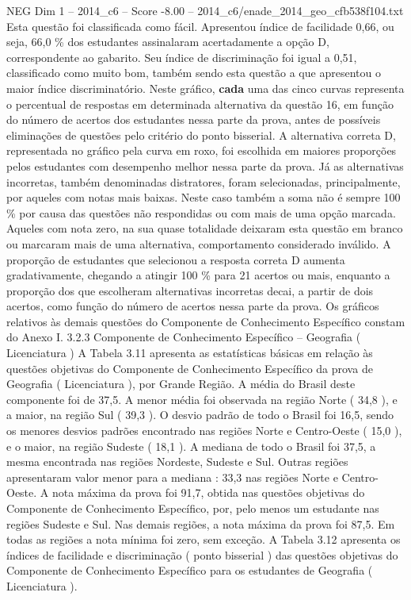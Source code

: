 \begin{textsample}{NEG Dim 1 – 2014\_c6 – Score -8.00 – 2014\_c6/enade\_2014\_geo\_cfb538f104.txt}
Esta questão foi classificada como fácil.
Apresentou índice de facilidade 0,66, ou seja, 66,0 \% dos estudantes assinalaram acertadamente a opção D, correspondente ao gabarito.
Seu índice de discriminação foi igual a 0,51, classificado como muito bom, também sendo esta questão a que apresentou o maior índice discriminatório.
Neste gráfico, \textbf{cada} uma das cinco curvas representa o percentual de respostas em determinada alternativa da questão 16, em função do número de acertos dos estudantes nessa parte da prova, antes de possíveis eliminações de questões pelo critério do ponto bisserial.
A alternativa correta D, representada no gráfico pela curva em roxo, foi escolhida em maiores proporções pelos estudantes com desempenho melhor nessa parte da prova.
Já as alternativas incorretas, também denominadas distratores, foram selecionadas, principalmente, por aqueles com notas mais baixas.
Neste caso também a soma não é sempre 100 \% por causa das questões não respondidas ou com mais de uma opção marcada.
Aqueles com nota zero, na sua quase totalidade deixaram esta questão em branco ou marcaram mais de uma alternativa, comportamento considerado inválido.
A proporção de estudantes que selecionou a resposta correta D aumenta gradativamente, chegando a atingir 100 \% para 21 acertos ou mais, enquanto a proporção dos que escolheram alternativas incorretas decai, a partir de dois acertos, como função do número de acertos nessa parte da prova.
Os gráficos relativos às demais questões do Componente de Conhecimento Específico constam do Anexo I. 3.2.3 Componente de Conhecimento Específico – Geografia ( Licenciatura ) A Tabela 3.11 apresenta as estatísticas básicas em relação às questões objetivas do Componente de Conhecimento Específico da prova de Geografia ( Licenciatura ), por Grande Região.
A média do Brasil deste componente foi de 37,5.
A menor média foi observada na região Norte ( 34,8 ), e a maior, na região Sul ( 39,3 ).
O desvio padrão de todo o Brasil foi 16,5, sendo os menores desvios padrões encontrado nas regiões Norte e Centro-Oeste ( 15,0 ), e o maior, na região Sudeste ( 18,1 ).
A mediana de todo o Brasil foi 37,5, a mesma encontrada nas regiões Nordeste, Sudeste e Sul.
Outras regiões apresentaram valor menor para a mediana : 33,3 nas regiões Norte e Centro-Oeste.
A nota máxima da prova foi 91,7, obtida nas questões objetivas do Componente de Conhecimento Específico, por, pelo menos um estudante nas regiões Sudeste e Sul.
Nas demais regiões, a nota máxima da prova foi 87,5.
Em todas as regiões a nota mínima foi zero, sem exceção.
A Tabela 3.12 apresenta os índices de facilidade e discriminação ( ponto bisserial ) das questões objetivas do Componente de Conhecimento Específico para os estudantes de Geografia ( Licenciatura ).

\end{textsample}
